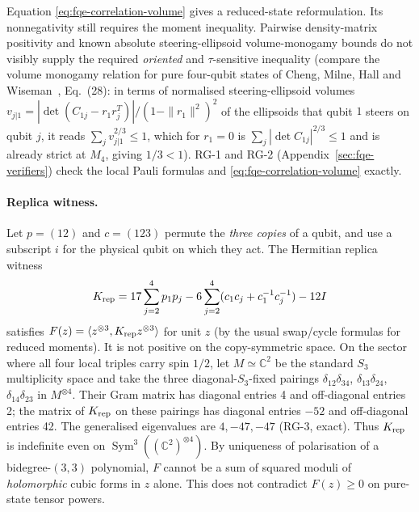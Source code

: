 Equation \eqref{eq:fqe-correlation-volume} gives a reduced-state reformulation.
Its nonnegativity still requires the moment inequality. Pairwise density-matrix positivity and known absolute
steering-ellipsoid volume-monogamy bounds do not visibly supply the required \emph{oriented} and
\(\tau\)-sensitive inequality (compare the volume monogamy relation for pure four-qubit states of
Cheng, Milne, Hall and Wiseman~\cite{CMHW}, Eq.~(28): in terms of normalised steering-ellipsoid
volumes \(v_{j|1}=|\det(C_{1j}-r_1r_j^T)|/(1-\|r_1\|^2)^2\) of the ellipsoids that qubit \(1\) steers on
qubit \(j\), it reads \(\sum_j v_{j|1}^{2/3}\le1\), which for \(r_1=0\) is
\(\sum_j|\det C_{1j}|^{2/3}\le1\) and is already strict at \(M_4\), giving \(1/3<1\)). RG-1 and RG-2 (Appendix~\ref{sec:fqe-verifiers}) check the local Pauli
formulas and \eqref{eq:fqe-correlation-volume} exactly.

\paragraph{Replica witness.} Let \(p=(12)\) and \(c=(123)\) permute
the \emph{three copies} of a qubit, and use a subscript \(i\) for the physical qubit on which they
act. The Hermitian replica witness \[
K_{\rm rep}=17\sum_{j=2}^4p_1p_j-6\sum_{j=2}^4(c_1c_j+c_1^{-1}c_j^{-1})-12I
\] satisfies \(F(z)=\langle z^{\otimes3},K_{\rm rep}z^{\otimes3}\rangle\) for unit \(z\) (by the usual
swap/cycle formulas for reduced moments). It is not positive on the
copy-symmetric space. On the sector where all four local triples carry spin \(1/2\),
let \(M\simeq\mathbb C^2\) be the standard \(S_3\) multiplicity space and take the three
diagonal-\(S_3\)-fixed pairings \(\delta_{12}\delta_{34}\), \(\delta_{13}\delta_{24}\),
\(\delta_{14}\delta_{23}\) in \(M^{\otimes4}\). Their Gram matrix has diagonal entries 4 and
off-diagonal entries 2; the matrix of \(K_{\rm rep}\) on these pairings has diagonal entries \(-52\) and
off-diagonal entries 42. The generalised eigenvalues are \(4,-47,-47\) (RG-3, exact). Thus
\(K_{\rm rep}\) is indefinite even on \(\operatorname{Sym}^3((\mathbb
C^2)^{\otimes4})\). By uniqueness of polarisation of a bidegree-\((3,3)\) polynomial, \(F\) cannot
be a sum of squared moduli of \emph{holomorphic} cubic forms in \(z\) alone. This does not contradict \(F(z)\ge0\) on pure-state tensor powers.
